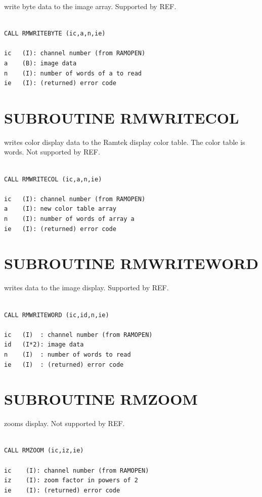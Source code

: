 \documentclass[11pt]{report}
\begin{document}
 write byte  data to the  image array.  Supported
by REF.
\begin{verbatim}

CALL RMWRITEBYTE (ic,a,n,ie)

ic   (I): channel number (from RAMOPEN)
a    (B): image data
n    (I): number of words of a to read
ie   (I): (returned) error code
\end{verbatim}

\section{SUBROUTINE RMWRITECOL}

 writes  color display data to the Ramtek display
color table.  The color table is  words.
Not supported by REF.
\begin{verbatim}

CALL RMWRITECOL (ic,a,n,ie)

ic   (I): channel number (from RAMOPEN)
a    (I): new color table array
n    (I): number of words of array a
ie   (I): (returned) error code
\end{verbatim}

\section{SUBROUTINE RMWRITEWORD}

 writes   data to the  image display.
Supported by REF.
\begin{verbatim}

CALL RMWRITEWORD (ic,id,n,ie)

ic   (I)  : channel number (from RAMOPEN)
id   (I*2): image data
n    (I)  : number of words to read
ie   (I)  : (returned) error code
\end{verbatim}

\section{SUBROUTINE RMZOOM}

 zooms  display.  Not supported by REF.
\begin{verbatim}

CALL RMZOOM (ic,iz,ie)

ic    (I): channel number (from RAMOPEN)
iz    (I): zoom factor in powers of 2
ie    (I): (returned) error code
\end{verbatim}
\end{document}
